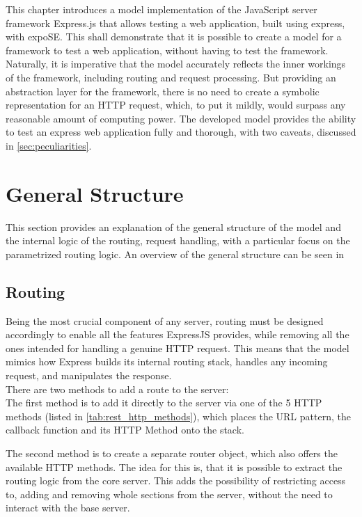 \label{ch:}
This chapter introduces a model implementation of the JavaScript server framework Express.js that allows testing a web application, built using express, with expoSE. This shall demonstrate that it is possible to create a model for a framework to test a web application, without having to test the framework. Naturally, it is imperative that the model accurately reflects  the inner workings of the framework, including routing and request processing. But providing an abstraction layer for the framework, there is no need to create a symbolic representation for an HTTP request, which, to put it mildly, would surpass any reasonable amount of computing power.
The developed model provides the ability to test an express web application fully and thorough, with two caveats, discussed in \autoref{sec:peculiarities}.

\section{General Structure}

This section provides an explanation of the general structure of the model and the internal logic of the routing, request handling, with a particular focus on the parametrized routing logic. An overview of the general structure can be seen in 





\subsection{Routing} 
Being the most crucial component of any server, routing must be designed accordingly to enable all the features ExpressJS provides, while removing all the ones intended for handling a genuine HTTP request. This means that the model mimics how Express builds its internal routing stack, handles any incoming request, and manipulates the response. \\
There are two methods to add a route to the server:\\ 
The first method is to add it directly to the server via one of the 5 HTTP methods (listed in \autoref{tab:rest_http_methods}), which places the URL pattern, the callback function and its HTTP Method onto the stack. 

The second method is to create a separate router object, which also offers the available HTTP methods. The idea for this is, that it is possible to extract the routing logic from the core server. This adds the possibility of restricting access to, adding and removing whole sections from the server, without the need to interact with the base server.

